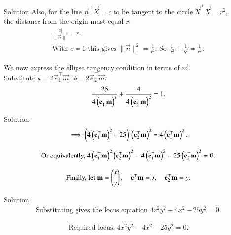 \documentclass{beamer}
\begin{document}
\begin{frame}{Solution}
Also, for the line $\vec{n}^\top\vec{X}=c$ to be tangent to the circle $\vec{X}^\top\vec{X}=r^2$,\\ 
the distance from the origin must equal $r$.
\begin{align}
    \frac{|c|}{\|\vec{n}\|}=r.\\
    \text{With } c=1 \text{ this gives } \|\vec{n}\|^2 = \frac{1}{r^2}.
    \text{ So }
    \frac{1}{a^2}+\frac{1}{b^2}=\frac{1}{r^2}.
\end{align}

We now express the ellipse tangency condition in terms of $\vec{m}$.\\
Substitute $a=2\vec{e}_1^\top\vec{m},\; b=2\vec{e}_2^\top\vec{m}:$
\begin{align}
\frac{25}{4\left(\mathbf{e}_1^\top\mathbf{m}\right)^2}+\frac{4}{4\left(\mathbf{e}_2^\top\mathbf{m}\right)^2}=1.
\end{align}
\end{frame}

\begin{frame}{Solution}
\begin{align}
\implies \left(4\left(\mathbf{e}_1^\top\mathbf{m}\right)^2-25\right)\,\left(\mathbf{e}_2^\top\mathbf{m}\right)^2
=4\left(\mathbf{e}_1^\top\mathbf{m}\right)^2.
\end{align}

\begin{align}
\text{Or equivalently, }
4\left(\mathbf{e}_1^\top\mathbf{m}\right)^2\left(\mathbf{e}_2^\top\mathbf{m}\right)^2
-4\left(\mathbf{e}_1^\top\mathbf{m}\right)^2
-25\left(\mathbf{e}_2^\top\mathbf{m}\right)^2
=0.
\end{align}

\begin{align}
\text{Finally, let } 
\mathbf{m}=\begin{pmatrix}x\\[4pt] y\end{pmatrix},
\quad \mathbf{e}_1^\top\mathbf{m}=x,\quad \mathbf{e}_2^\top\mathbf{m}=y.
\end{align}
\end{frame}

\begin{frame}{Solution}
\begin{align}
\text{Substituting gives the locus equation }
4x^2y^2 - 4x^2 - 25y^2 = 0.
\end{align}

\begin{align}
\text{Required locus: } 4x^2y^2 - 4x^2 - 25y^2 = 0.
\end{align}
\end{frame}
\end{document}
